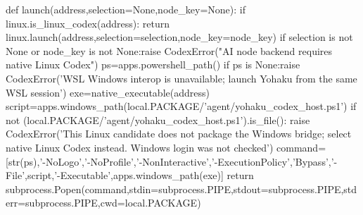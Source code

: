 def launch(address,selection=None,node_key=None):
    if linux.is_linux_codex(address):
        return linux.launch(address,selection=selection,node_key=node_key)
    if selection is not None or node_key is not None:raise CodexError("AI node backend requires native Linux Codex")
    ps=apps.powershell_path()
    if ps is None:raise CodexError('WSL Windows interop is unavailable; launch Yohaku from the same WSL session')
    exe=native_executable(address)
    script=apps.windows_path(local.PACKAGE/'agent/yohaku_codex_host.ps1')
    if not (local.PACKAGE/'agent/yohaku_codex_host.ps1').is_file():
        raise CodexError('This Linux candidate does not package the Windows bridge; select native Linux Codex instead. Windows login was not checked')
    command=[str(ps),'-NoLogo','-NoProfile','-NonInteractive','-ExecutionPolicy','Bypass','-File',script,'-Executable',apps.windows_path(exe)]
    return subprocess.Popen(command,stdin=subprocess.PIPE,stdout=subprocess.PIPE,stderr=subprocess.PIPE,cwd=local.PACKAGE)

